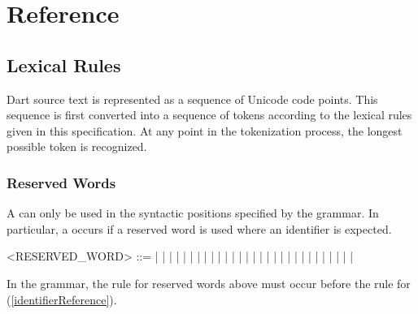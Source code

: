 \documentclass[makeidx]{article}
\begin{document}
\section{Reference}


\subsection{Lexical Rules}

\LMHash{}%
Dart source text is represented as a sequence of Unicode code points.
This sequence is first converted into a sequence of tokens
according to the lexical rules given in this specification.
At any point in the tokenization process,
the longest possible token is recognized.


\subsubsection{Reserved Words}

\LMHash{}%
A  can only be used in the syntactic positions
specified by the grammar.
In particular, a  occurs if a reserved word is used
where an identifier is expected.


\begin{grammar}
<RESERVED\_WORD> ::= \ASSERT{} | \BREAK{} | \CASE{} | \CATCH{} |
    \CLASS{} | \CONST{}
  \alt\hspace{-3mm} \CONTINUE{} | \DEFAULT{} | \DO{} | \ELSE{} | \ENUM{} |
    \EXTENDS{} | \FALSE{} | \FINAL{} | \FINALLY{} | \FOR{}
  \alt\hspace{-3mm} \IF{} | \IN{} | \IS{} | \NEW{} | \NULL{} | \RETHROW{} |
    \RETURN{} | \SUPER{} | \SWITCH{} | \THIS{} | \THROW{}
  \alt\hspace{-3mm} \TRUE{} | \TRY{} | \VAR{} | \VOID{} | \WHILE{} | \WITH{}
\end{grammar}

\LMHash{}%
In the grammar, the rule for reserved words above must occur
before the rule for 
(\ref{identifierReference}).

\end{document}

